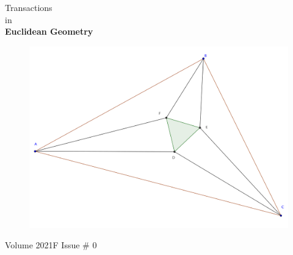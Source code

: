 \documentclass{report}
\begin{document}
\thispagestyle{empty}
\begin{center}
{\Huge Transactions\\ in\\[.2in] \textbf{Euclidean Geometry}}
\vspace{1in}

\begin{figure}[h!]
\includegraphics[width=1.1\textwidth]{cover-image.png}
\end{figure}

\vspace{1in}

{\Huge Volume 2021F Issue \# 0}
\end{center}

\clearpage
\end{document}
